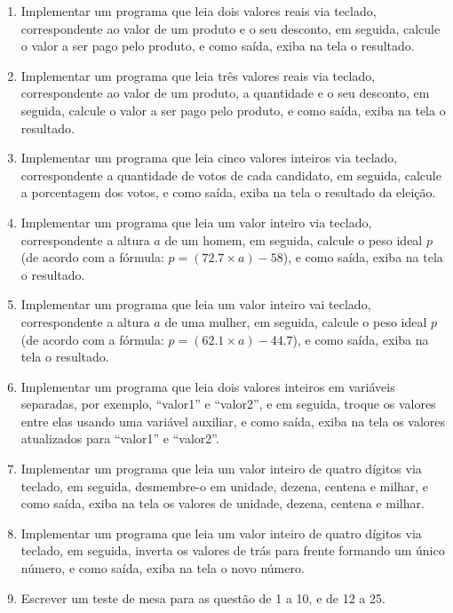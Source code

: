 \documentclass[11pt]{article}
\begin{document}
\begin{enumerate}
	\item Implementar um programa que leia dois valores reais via teclado, correspondente ao valor de um
	produto e o seu desconto, em seguida, calcule o valor a ser pago pelo produto, e como saída,
	exiba na tela o resultado.
	
	\item Implementar um programa que leia três valores reais via teclado, correspondente ao valor de um
	produto, a quantidade e o seu desconto, em seguida, calcule o valor a ser pago pelo produto, e
	como saída, exiba na tela o resultado.
	
	\item  Implementar um programa que leia cinco valores inteiros via teclado, correspondente a quantidade
	de votos de cada candidato, em seguida, calcule a porcentagem dos votos, e como saída, exiba
	na tela o resultado da eleição.
	
	\item  Implementar um programa que leia um valor inteiro via teclado, correspondente a altura $a$ de
	um homem, em seguida, calcule o peso ideal $p$ (de acordo com a fórmula: $p = (72.7 \times a) - 58$),
	e como saída, exiba na tela o resultado.
	
	\item Implementar um programa que leia um valor inteiro vai teclado, correspondente a altura $a$ de
	uma mulher, em seguida, calcule o peso ideal $p$ (de acordo com a fórmula: $p = (62.1 \times a) - 44.7$),
	e como saída, exiba na tela o resultado.
	
	\item  Implementar um programa que leia dois valores inteiros em variáveis separadas, por exemplo,
	``valor1'' e ``valor2'', e em seguida, troque os valores entre elas usando uma variável auxiliar, e
	como saída, exiba na tela os valores atualizados para ``valor1'' e ``valor2''.
	
	\item Implementar um programa que leia um valor inteiro de quatro dígitos via teclado, em seguida,
	desmembre-o em unidade, dezena, centena e milhar, e como saída, exiba na tela os valores de
	unidade, dezena, centena e milhar.
	
	\item  Implementar um programa que leia um valor inteiro de quatro dígitos via teclado, em seguida,
	inverta os valores de trás para frente formando um único número, e como saída, exiba na tela o
	novo número.
	
	\item Escrever um teste de mesa para as questão de 1 a 10, e de 12 a 25.
\end{enumerate}
\end{document}
